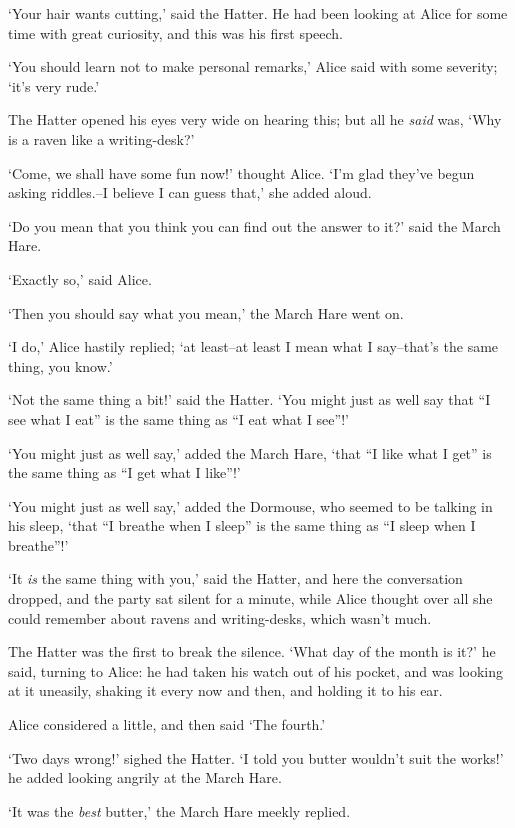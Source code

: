   `Your hair wants cutting,' said the Hatter.  He had been
looking at Alice for some time with great curiosity, and this was
his first speech.

  `You should learn not to make personal remarks,' Alice said
with some severity; `it's very rude.'

  The Hatter opened his eyes very wide on hearing this; but all
he {\it said} was, `Why is a raven like a writing-desk?'

  `Come, we shall have some fun now!' thought Alice.  `I'm glad
they've begun asking riddles.--I believe I can guess that,' she
added aloud.

  `Do you mean that you think you can find out the answer to it?'
said the March Hare.

  `Exactly so,' said Alice.

  `Then you should say what you mean,' the March Hare went on.

  `I do,' Alice hastily replied; `at least--at least I mean what
I say--that's the same thing, you know.'

  `Not the same thing a bit!' said the Hatter.  `You might just
as well say that ``I see what I eat'' is the same thing as ``I eat
what I see''!'

  `You might just as well say,' added the March Hare, `that ``I
like what I get'' is the same thing as ``I get what I like''!'

  `You might just as well say,' added the Dormouse, who seemed to
be talking in his sleep, `that ``I breathe when I sleep'' is the
same thing as ``I sleep when I breathe''!'

  `It {\it is} the same thing with you,' said the Hatter, and here the
conversation dropped, and the party sat silent for a minute,
while Alice thought over all she could remember about ravens and
writing-desks, which wasn't much.

  The Hatter was the first to break the silence.  `What day of
the month is it?' he said, turning to Alice:  he had taken his
watch out of his pocket, and was looking at it uneasily, shaking
it every now and then, and holding it to his ear.

  Alice considered a little, and then said `The fourth.'

  `Two days wrong!' sighed the Hatter.  `I told you butter
wouldn't suit the works!' he added looking angrily at the March
Hare.

  `It was the {\it best} butter,' the March Hare meekly replied.

